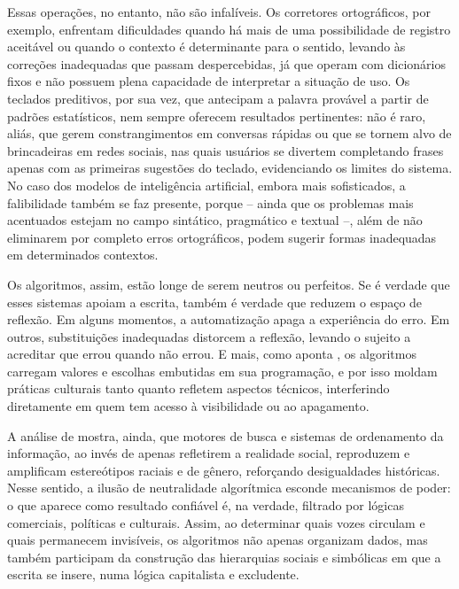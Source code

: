 \documentclass[portuguese]{textolivre}
\begin{document}
Essas operações, no entanto, não são infalíveis. Os corretores ortográficos, por exemplo, enfrentam dificuldades quando há mais de uma possibilidade de registro aceitável ou quando o contexto é determinante para o sentido, levando às correções inadequadas que passam despercebidas, já que operam com dicionários fixos e não possuem plena capacidade de interpretar a situação de uso. Os teclados preditivos, por sua vez, que antecipam a palavra provável a partir de padrões estatísticos, nem sempre oferecem resultados pertinentes: não é raro, aliás, que gerem constrangimentos em conversas rápidas ou que se tornem alvo de brincadeiras em redes sociais, nas quais usuários se divertem completando frases apenas com as primeiras sugestões do teclado, evidenciando os limites do sistema. No caso dos modelos de inteligência artificial, embora mais sofisticados, a falibilidade também se faz presente, porque – ainda que os problemas mais acentuados estejam no campo sintático, pragmático e textual –, além de não eliminarem por completo erros ortográficos, podem sugerir formas inadequadas em determinados contextos.

Os algoritmos, assim, estão longe de serem neutros ou perfeitos. Se é verdade que esses sistemas apoiam a escrita, também é verdade que reduzem o espaço de reflexão. Em alguns momentos, a automatização apaga a experiência do erro. Em outros, substituições inadequadas distorcem a reflexão, levando o sujeito a acreditar que errou quando não errou. E mais, como aponta \textcite{noble2018algorithms}, os algoritmos carregam valores e escolhas embutidas em sua programação, e por isso moldam práticas culturais tanto quanto refletem aspectos técnicos, interferindo diretamente em quem tem acesso à visibilidade ou ao apagamento.

A análise de \textcite{noble2018algorithms} mostra, ainda, que motores de busca e sistemas de ordenamento da informação, ao invés de apenas refletirem a realidade social, reproduzem e amplificam estereótipos raciais e de gênero, reforçando desigualdades históricas. Nesse sentido, a ilusão de neutralidade algorítmica esconde mecanismos de poder: o que aparece como resultado confiável é, na verdade, filtrado por lógicas comerciais, políticas e culturais. Assim, ao determinar quais vozes circulam e quais permanecem invisíveis, os algoritmos não apenas organizam dados, mas também participam da construção das hierarquias sociais e simbólicas em que a escrita se insere, numa lógica capitalista e excludente.
\end{document}
